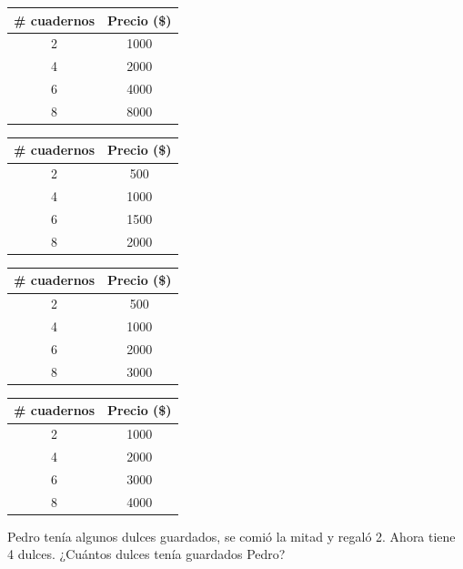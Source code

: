 \documentclass[10pt,letterpaper,addpoints]{exam}
\begin{document}
\begin{multicols}{2}
\begin{questions}
\begin{choices}
\choice \begin{tabular}{|c|c|}
\hline 
\# cuadernos & Precio (\$) \\ 
\hline 
2 & 1000 \\ 
\hline 
4 & 2000 \\ 
\hline 
6 & 4000 \\ 
\hline 
8 & 8000 \\ 
\hline 
\end{tabular}
\choice \begin{tabular}{|c|c|}
\hline 
\# cuadernos & Precio (\$) \\ 
\hline 
2 & 500 \\ 
\hline 
4 & 1000 \\ 
\hline 
6 & 1500 \\ 
\hline 
8 & 2000 \\ 
\hline 
\end{tabular} 
\choice \begin{tabular}{|c|c|}
\hline 
\# cuadernos & Precio (\$) \\ 
\hline 
2 & 500 \\ 
\hline 
4 & 1000 \\ 
\hline 
6 & 2000 \\ 
\hline 
8 & 3000 \\ 
\hline 
\end{tabular} 
\CorrectChoice \begin{tabular}{|c|c|}
\hline 
\# cuadernos & Precio (\$) \\ 
\hline 
2 & 1000 \\ 
\hline 
4 & 2000 \\ 
\hline 
6 & 3000 \\ 
\hline 
8 & 4000 \\ 
\hline 
\end{tabular} 
\end{choices}
\question Pedro tenía algunos dulces guardados, se comió la mitad y regaló 2. Ahora tiene 4 dulces. ¿Cuántos dulces tenía guardados Pedro?


\end{questions}
\end{multicols}
\end{document}
